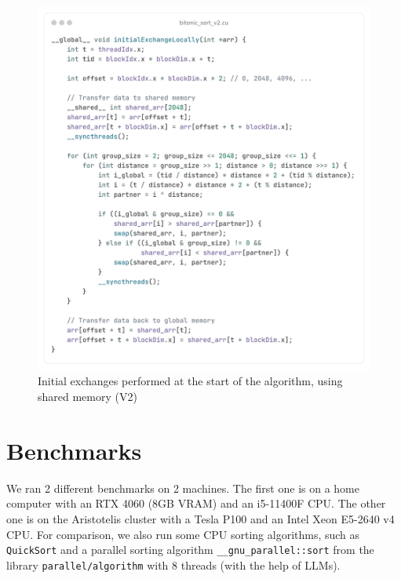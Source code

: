 \documentclass{article}
\begin{document}
\begin{figure}[H]
    \centering
    \includegraphics[width=1\textwidth]{initial-exchange-locally-v2.png}
    \caption{Initial exchanges performed at the start of the algorithm, using shared memory (V2)}
    \label{alg:initial-exchange-locally-v2}
\end{figure}

\section{Benchmarks}

We ran 2 different benchmarks on 2 machines. The first one is on a home computer with an RTX 4060 (8GB VRAM) and an i5-11400F CPU.
The other one is on the Aristotelis cluster with a Tesla P100 and an Intel Xeon E5-2640 v4 CPU. For comparison, we also run some CPU
sorting algorithms, such as \texttt{QuickSort} and a parallel sorting algorithm \texttt{\_\_gnu\_parallel::sort} from the library
\texttt{parallel/algorithm} with 8 threads (with the help of LLMs).
\end{document}
